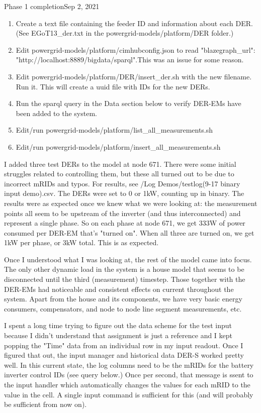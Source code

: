 \begin{entry}{Phase 1 completion}{Sep 2, 2021}
    \begin{enumerate}
        \item Create a text file containing the feeder ID and information about each DER. (See EGoT13\_der.txt in the
        powergrid-models/platform/DER folder.)
        \item Edit powergrid-models/platform/cimhubconfig.json to read "blazegraph\_url":
        "http://localhost:8889/bigdata/sparql".This was an issue for some reason.
        \item Edit powergrid-models/platform/DER/insert\_der.sh with the new filename. Run it. This will create a uuid
        file with IDs for the new DERs.
        \item Run the sparql query in the Data section below to verify DER-EMs have been added to the system.
        \item Edit/run powergrid-models/platform/list\_all\_measurements.sh
        \item Edit/run powergrid-models/platform/insert\_all\_measurements.sh
    \end{enumerate}

    I added three test DERs to the model at node 671. There were some initial struggles related to controlling them,
    but these all turned out to be due to incorrect mRIDs and typos. For results,
    see /Log Demos/testlog(9-17 binary input demo).csv. The DERs were set to 0 or 1kW, counting up in binary. The
    results were as expected once we knew what we were looking at: the measurement points all seem to be upstream of
    the inverter (and thus interconnected) and represent a single phase. So on each phase at node 671, we get 333W of
    power consumed per DER-EM that's "turned on". When all three are turned on, we get 1kW per phase, or 3kW total. This
    is as expected.

    Once I understood what I was looking at, the rest of the model came into focus. The only other dynamic load in the
    system is a house model that seems to be disconnected until the third (measurement) timestep. Those together with
    the DER-EMs had noticeable and consistent effects on current throughout the system. Apart from the house and its
    components, we have very basic energy consumers, compensators, and node to node line segment measurements, etc.



    I spent a long time trying to figure out the data scheme for the test input because I didn't understand that
    assignment is just a reference and I kept popping the "Time" data from an individual row in my input readout.
    Once I figured that out, the input manager and historical data DER-S worked pretty well. In this current state,
    the log columns need to be the mRIDs for the battery inverter control IDs (see query below.) Once per second,
    that message is ssent to the input handler which automatically changes the values for each mRID to the value in the
    cell. A single input command is sufficient for this (and will probably be sufficient from now on).


\end{entry}
